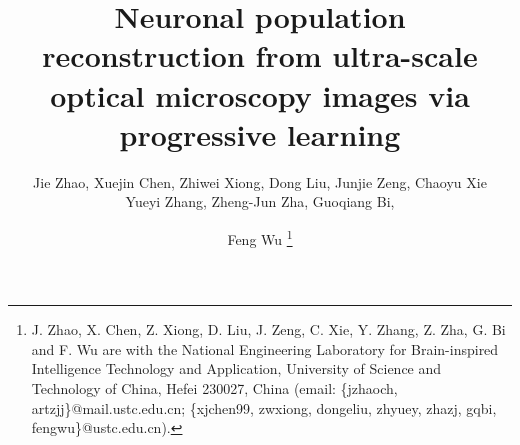 \documentclass[journal]{IEEEtran}
\begin{document}
%
\title{Neuronal population reconstruction from ultra-scale optical microscopy images via progressive learning}
% 
%
%
\author{Jie Zhao, Xuejin Chen, Zhiwei Xiong, Dong Liu, Junjie Zeng, Chaoyu Xie\\Yueyi Zhang, Zheng-Jun Zha, Guoqiang Bi, \and Feng Wu
\thanks{J. Zhao, X. Chen, Z. Xiong, D. Liu, J. Zeng, C. Xie, Y. Zhang, Z. Zha, G. Bi and F. Wu are with the National Engineering Laboratory for Brain-inspired Intelligence Technology and Application, University of Science and Technology of China, Hefei 230027, China (email: \{jzhaoch, artzjj\}@mail.ustc.edu.cn; \{xjchen99, zwxiong, dongeliu, zhyuey, zhazj, gqbi, fengwu\}@ustc.edu.cn).}
}
\end{document}
